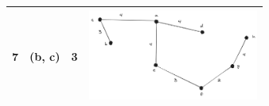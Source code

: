 \documentclass[12pt,titlepage]{article}
\begin{document}
\begin{table}[h]
\begin{tabularx}{\textwidth}{|c|c|c|X|}
        \hline
        7 & (b, c) & 3 & \includegraphics[height=3cm]{./images/tree-c-b.png} \\
        \hline
    \end{tabularx}
\end{table}
\end{document}
